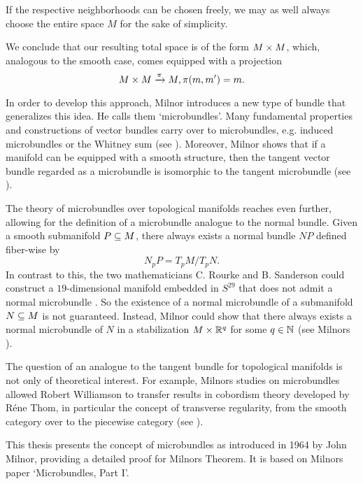 \begin{myparagraph}
If the respective neighborhoods can be chosen freely, we may as well always choose the entire space $M$ for the sake of simplicity.

We conclude that our resulting total space is of the form $M \times M$, which, analogous to the smooth case, comes equipped with a projection \[ M \times M \xrightarrow{\pi} M, \pi(m, m') = m. \]

In order to develop this approach, Milnor introduces a new type of bundle that generalizes this idea. He calls them `microbundles'. Many fundamental properties and constructions of vector bundles carry over to microbundles, e.g. induced microbundles or the Whitney sum (see ). Moreover, Milnor shows that if a manifold can be equipped with a smooth structure, then the tangent vector bundle regarded as a microbundle is isomorphic to the tangent microbundle (see ).

The theory of microbundles over topological manifolds reaches even further, allowing for the definition of a microbundle analogue to the normal bundle. Given a smooth submanifold $P \subseteq{} M$, there always exists a normal bundle $NP$ defined fiber-wise by \[ N_p P = T_p M / T_p N. \] In contrast to this, the two mathematicians C. Rourke and B. Sanderson could construct a $19$-dimensional manifold embedded in $S^{29}$ that does not admit a normal microbundle \cite{rourke}. So the existence of a normal microbundle of a submanifold $N \subseteq{} M$ is not guaranteed. Instead, Milnor could show that there always exists a normal microbundle of $N$ in a stabilization $M \times \mathbb{R}^q$ for some $q \in \mathbb{N}$ (see Milnors ).

The question of an analogue to the tangent bundle for topological manifolds is not only of theoretical interest. For example, Milnors studies on microbundles allowed Robert Williamson to transfer results in cobordism theory developed by Réne Thom, in particular the concept of transverse regularity, from the smooth category over to the piecewise category (see \cite[§3]{williamson}).

This thesis presents the concept of microbundles as introduced in 1964 by John Milnor, providing a detailed proof for Milnors Theorem. It is based on Milnors paper `Microbundles, Part I'\cite{milnor}.
\end{myparagraph}